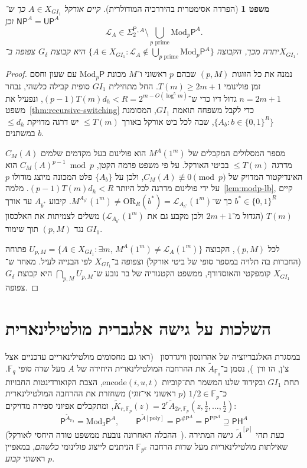 \documentclass[11pt,a4paper]{article}
\newtheorem{theorem}{משפט}[section]
\theoremstyle{definition}
\theoremstyle{remark}
\newcommand{\Pcl}{\mathsf{P}}
\newcommand{\NP}{\mathsf{NP}}
\newcommand{\UP}{\mathsf{UP}}
\newcommand{\PP}{\mathsf{PP}}
\newcommand{\PH}{\mathsf{PH}}
\newcommand{\Modp}{\mathrm{Mod}_p\mathsf{P}}
\newcommand{\Modthree}{\mathrm{Mod}_3\mathsf{P}}
\newcommand{\SharpP}{\#\mathsf{P}}
\newcommand{\SigTwo}{\Sigma_2^{\mathsf{P}}}
\newcommand{\OR}{\mathrm{OR}}
\newcommand{\F}{\mathbb{F}}
\newcommand{\GI}{GI_1}
\begin{document}
\begin{theorem}[הפרדה אסימטרית בהיררכיה המודולרית]
\label{thm:main-sep}
קיים אורקל $A \in X_{\GI}$ כך ש־$\NP^A = \UP^A$ וכן
\[
  \mathcal{L}_A \in \SigTwo{}^{,A} \setminus \bigcup_{p\text{ prime}} \Modp^A.
\]
יתרה מכך, הקבוצה $\{A \in X_{\GI} : \mathcal{L}_A \notin \bigcup_{p\text{ prime}} \Modp^A\}$ היא קבוצת $G_\delta$ צפופה ב־$X_{\GI}$.
\end{theorem}

\begin{proof}
נמנה את כל הזוגות $(p, M)$ שבהם $p$ ראשוני ו־$M$ מכונת $\Modp$ עם שעון וחסם זמן פולינומי $T(m) \ge 2m + 1$. החל מתחילית $\GI$ סופית קבילה כלשהי, נבחר $n = 2m+1$ גדול דיו כדי ש־$(p-1) T(m) d_h < R = 2^{m - O(\log^5 m)}$, ונפעיל את משפט~\ref{thm:recursive-switching} כדי לקבל משפחה תואמת $\GI$, המסומנת $\{A_b : b \in \{0,1\}^R\}$, שבה לכל ביט אורקל באורך $\le T(m)$ יש דרגה מדויקת $\le d_h$ במשתנים $b$.

מספר המסלולים המקבלים של $M^A(1^m)$ הוא פולינום בעל מקדמים שלמים $C_M(A)$ מדרגה $\le T(m)$ בביטי האורקל. על פי משפט פרמה הקטן, $C_M(A)^{p-1} \bmod p$ הוא האינדיקטור המדויק של $C_M(A) \not\equiv 0 \pmod p$, ולכן על $\{A_b\}$ פלט המכונה מיוצג מודולו $p$ על ידי פולינום מדרגה לכל היותר $(p-1)T(m)d_h < R$. מלמה~\ref{lem:modp-lb}, קיים $b^* \in \{0,1\}^R$ כך ש־$M^{A_{b^*}}(1^m) \ne \OR_R(b^*) = \mathcal{L}_{A_{b^*}}(1^m)$. קיבוע $A_{b^*}$ עד אורך $T(m)$ (הגדול מ־$2m+1$ ולכן מקבע גם את $\mathcal{L}_{A_{b^*}}(1^m)$) משלים לצמיתות את האלכסון נגד $(p, M)$ תוך שימור $\GI$.

לכל $(p, M)$, הקבוצה $U_{p,M} = \{A \in X_{\GI} : \exists m,\, M^A(1^m) \ne \mathcal{L}_A(1^m)\}$ פתוחה (החברות בה תלויה במספר סופי של ביטי אורקל) וצפופה ב־$X_{\GI}$ לפי הבנייה לעיל. מאחר ש־$X_{\GI}$ קומפקטי והאוסדורף, ממשפט הקטגוריה של בר נובע ש־$\bigcap_{p,M} U_{p,M}$ היא קבוצת $G_\delta$ צפופה.
\end{proof}

\section{השלכות על גישה אלגברית מולטילינארית}

במסגרת האלגבריזציה של אהרונסון וויגדרסון~\cite{AaronsonWigderson2009} (ראו גם מחסומים מולטילינאריים עדכניים אצל צ'ן, הו ורן~\cite{ChenHuRen2026}), נסמן ב־$\widetilde{A}_{\F_q}$ את ההרחבה המולטילינארית היחידה של $A$ מעל שדה סופי $\F_q$. תחת $\GI$ ובקידוד שלנו המשמר תת־קוביות $\mathrm{encode}(i, u, t)$, הצבת הקואורדינטות החבויות כ־$1/2 \in \F_p$ ($p$ ראשוני אי־זוגי) משחזרת את ההרחבה המולטילינארית $\widetilde{K}_{r,\F_p}(z) = 2^r \widetilde{A}_{2r,\F_p}(z, \tfrac12, \dots, \tfrac12)$, ומתקבלים אפיוני ספירה מדויקים:
\[
  \Pcl^{\widetilde{A}_{\F_3}} = \Modthree^A,
  \qquad
  \Pcl^{\widetilde{A}[\mathrm{poly}]} = \Pcl^{\SharpP^A} = \Pcl^{\PP^A} \supseteq \PH^A
\]
(ההכלה האחרונה נובעת ממשפט טודה היחסי לאורקל~\cite{Toda1991}). כעת תהי $\widetilde{A}^{[p]}$ גישה המתירה שאילתות מולטילינאריות מעל שדות הרחבה $\F_{p^k}$ הניתנים לייצוג פולינומי \emph{כלשהם}, במאפיין ראשוני \emph{קבוע} $p$.
\end{document}
